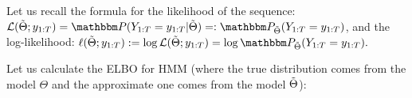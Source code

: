 \documentclass[shortabstract]{iithesis}
\begin{document}
Let us recall the formula for the likelihood of the sequence: \linebreak
    $\mathcal{L}(\Tilde{\Theta}; y_{1:T}) = \mathbbm P(Y_{1:T}=y_{1:T} | \Tilde{\Theta}) =: \mathbbm P_{\Tilde{\Theta}}(Y_{1:T}=y_{1:T})$,
and the log-likelihood:  \linebreak
    $\ell (\Tilde{\Theta}; y_{1:T}) := \log \mathcal{L}(\Tilde{\Theta}; y_{1:T}) = \log \mathbbm P_{\Tilde{\Theta}}(Y_{1:T}=y_{1:T})\text{.}$

Let us calculate the ELBO for HMM (where the true distribution comes from the model $\Theta$ and the approximate one comes from the model $\Tilde{\Theta}$):
\end{document}
